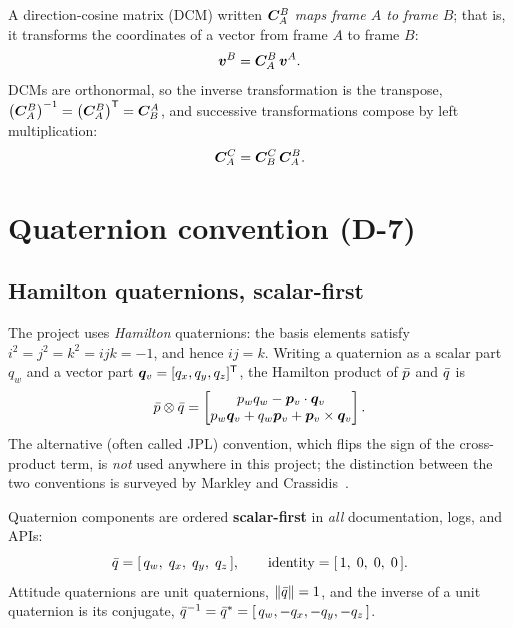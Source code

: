 A direction-cosine matrix (DCM) written $\bm{C}_{A}^{B}$ \emph{maps frame $A$ to
frame $B$}; that is, it transforms the coordinates of a vector from frame $A$
to frame $B$:
\begin{equation}
  \bm{v}^{B} = \bm{C}_{A}^{B}\,\bm{v}^{A}.
  \label{eq:notation:dcmdef}
\end{equation}
DCMs are orthonormal, so the inverse transformation is the transpose,
$\bigl(\bm{C}_{A}^{B}\bigr)^{-1} = \bigl(\bm{C}_{A}^{B}\bigr)^{\mathsf T} =
\bm{C}_{B}^{A}$, and successive transformations compose by left multiplication:
\begin{equation}
  \bm{C}_{A}^{C} = \bm{C}_{B}^{C}\,\bm{C}_{A}^{B}.
  \label{eq:notation:dcmcomp}
\end{equation}

\section{Quaternion convention (D-7)}
\label{sec:notation:quaternion}

\subsection{Hamilton quaternions, scalar-first}

The project uses \emph{Hamilton} quaternions: the basis elements satisfy
$i^2 = j^2 = k^2 = ijk = -1$, and hence $ij = k$. Writing a quaternion as a
scalar part $q_w$ and a vector part $\bm{q}_v = [q_x, q_y, q_z]^{\mathsf T}$,
the Hamilton product of $\bar{p}$ and $\bar{q}$ is
\begin{equation}
  \bar{p} \otimes \bar{q} =
  \begin{bmatrix}
    p_w q_w - \bm{p}_v \cdot \bm{q}_v \\
    p_w \bm{q}_v + q_w \bm{p}_v + \bm{p}_v \times \bm{q}_v
  \end{bmatrix}.
  \label{eq:notation:hamiltonproduct}
\end{equation}
The alternative (often called JPL) convention, which flips the sign of the
cross-product term, is \emph{not} used anywhere in this project; the
distinction between the two conventions is surveyed by Markley and
Crassidis~\cite{markley2014}.

Quaternion components are ordered \textbf{scalar-first} in \emph{all}
documentation, logs, and APIs:
\begin{equation}
  \bar{q} = [\,q_w,\; q_x,\; q_y,\; q_z\,],
  \qquad
  \text{identity} = [\,1,\; 0,\; 0,\; 0\,].
  \label{eq:notation:scalarfirst}
\end{equation}
Attitude quaternions are unit quaternions, $\left\lVert \bar{q} \right\rVert = 1$, and the
inverse of a unit quaternion is its conjugate,
$\bar{q}^{-1} = \bar{q}^{*} = [\,q_w, -q_x, -q_y, -q_z\,]$.

